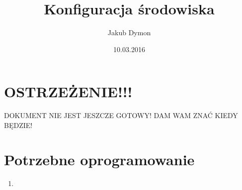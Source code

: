 \documentclass[a4paper, 11pt]{article}
\title{Konfiguracja środowiska}
\author{Jakub Dymon}
\date{10.03.2016}
\begin{document}
	\section{OSTRZEŻENIE!!!}
	\begin{Large}
		DOKUMENT NIE JEST JESZCZE GOTOWY! DAM WAM ZNAĆ KIEDY BĘDZIE!
	\end{Large}
	\section{Potrzebne oprogramowanie}
	\begin{enumerate}
		\item 
	\end{enumerate}
\end{document}
